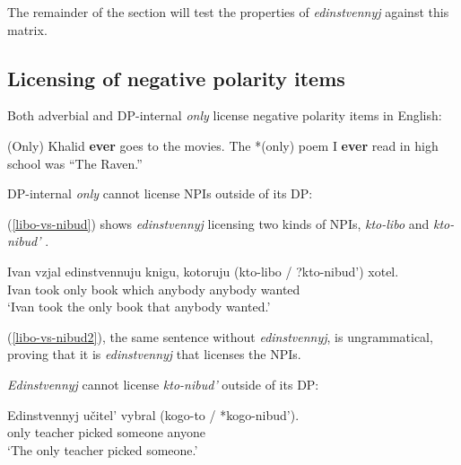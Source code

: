 The remainder of the section will test the properties of \textit{edinstvennyj} against this matrix.

\subsection{Licensing of negative polarity items}
Both adverbial and DP-internal \textit{only} license negative polarity items in English:

\begin{exe}
	\ex *(Only) Khalid \textbf{ever} goes to the movies.
	\ex The *(only) poem I \textbf{ever} read in high school was ``The Raven.''
\end{exe}

DP-internal \textit{only} cannot license NPIs outside of its DP:

\begin{exe}
\end{exe}

(\ref{libo-vs-nibud}) shows \textit{edinstvennyj} licensing two kinds of NPIs, \textit{kto-libo} \citep{pereltsvaig06} and \textit{kto-nibud'} \citep{russneg}.

\begin{exe}
	\ex \label{libo-vs-nibud} \gll Ivan vzjal edinstvennuju knigu, kotoruju (kto-libo / ?kto-nibud') xotel.\\
	Ivan took only book which anybody {} anybody wanted\\
	\glt `Ivan took the only book that anybody wanted.'
\end{exe}

(\ref{libo-vs-nibud2}), the same sentence without \textit{edinstvennyj}, is ungrammatical, proving that it is \textit{edinstvennyj} that licenses the NPIs.

\begin{exe}
\end{exe}

\textit{Edinstvennyj} cannot license \textit{kto-nibud'} outside of its DP:

\begin{exe}
	\ex \label{nibud-out-of-dp} \gll Edinstvennyj u\v{c}itel' vybral (kogo-to / *kogo-nibud').\\
	only teacher picked someone {} anyone\\
	\glt `The only teacher picked someone.'
\end{exe}

